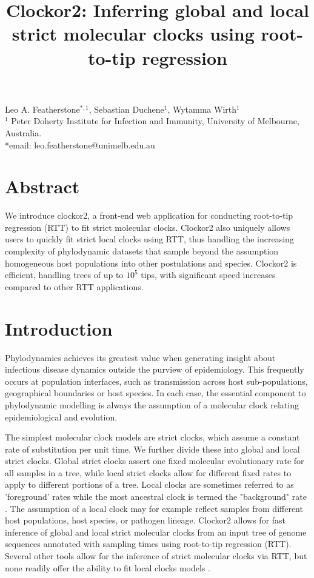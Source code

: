 \documentclass{article}
\title{Clockor2:  Inferring global and local strict molecular clocks using root-to-tip regression}
\begin{document}
\maketitle
\begin{centering}
Leo A. Featherstone$^{\ast,1}$, Sebastian Duchene$^1$, Wytamma Wirth$^{1}$\\
$^{1}$ Peter Doherty Institute for Infection and Immunity, University of Melbourne, Australia.\\
*email: leo.featherstone@unimelb.edu.au
\end{centering}

\section*{Abstract}
We introduce clockor2, a front-end web application for conducting root-to-tip regression (RTT) to fit strict molecular clocks. Clockor2 also uniquely allows users to quickly fit strict local clocks using RTT, thus handling the increasing complexity of phylodynamic datasets that sample beyond the assumption homogeneous host populations into other postulations and species. Clockor2 is efficient, handling trees of up to $10^5$ tips, with significant speed increases compared to other RTT applications.

\section*{Introduction}
Phylodynamics achieves its greatest value when generating insight about infectious disease dynamics outside the purview of epidemiology. This frequently occurs at population interfaces, such as transmission across host sub-populations,  geographical boundaries or host species. In each case, the essential component to phylodynamic modelling is always the assumption of a molecular clock relating epidemiological and evolution.

The simplest molecular clock models are strict clocks, which assume a constant rate of substitution per unit time. We further divide these into global and local strict clocks. Global strict clocks assert one fixed molecular evolutionary rate for all samples in a tree, while local strict clocks allow for different fixed rates to apply to different portions of a tree. Local clocks are sometimes referred to as 'foreground' rates while the most ancestral clock is termed the "background" rate \citep{worobey_synchronized_2014}. The assumption of a local clock may for example reflect samples from different host populations, host species, or pathogen lineage. Clockor2 allows for fast inference of global and local strict molecular clocks from an input tree of genome sequences annotated with sampling times using root-to-tip regression (RTT). Several other tools allow for the inference of strict molecular clocks via RTT, but none readily offer the ability to fit local clocks models \citep{rambaut_exploring_2016, hadfield_nextstrain_2018,sagulenko_treetime_2018,volz_scalable_2017}. 
\end{document}
